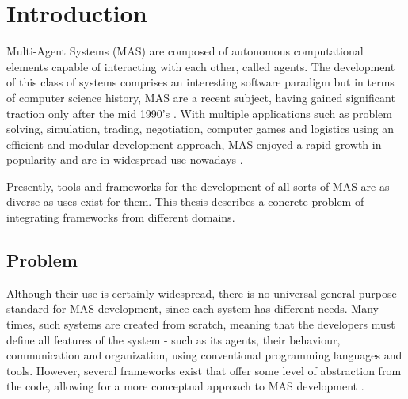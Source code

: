 \chapter{Introduction}
\label{chap:introduction}
Multi-Agent Systems (MAS) are composed of autonomous computational elements capable of interacting with each other, called agents. The development of this class of systems comprises an interesting software paradigm but in terms of computer science history, MAS are a recent subject, having gained significant traction only after the mid 1990's \cite{wooldridge2008introduction}. With multiple applications such as problem solving, simulation, trading, negotiation, computer games and logistics using an efficient and modular development approach, MAS enjoyed a rapid growth in popularity and are in widespread use nowadays \cite{ferber1999multi}.

Presently, tools and frameworks for the development of all sorts of MAS are as diverse as uses exist for them. This thesis describes a concrete problem of integrating frameworks from different domains.

\section{Problem}

Although their use is certainly widespread, there is no universal general purpose standard for MAS development, since each system has different needs. Many times, such systems are created from scratch, meaning that the developers must define all features of the system - such as its agents, their behaviour, communication and organization, using conventional programming languages and tools. However, several frameworks exist that offer some level of abstraction from the code, allowing for a more conceptual approach to
MAS development \cite{gormer2011jrep}. 


